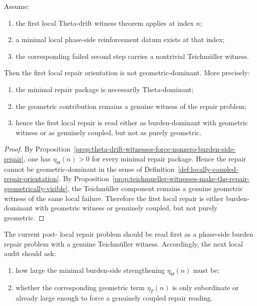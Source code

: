 \begin{theorem}
\label{thm:first-local-repair-orientation-theorem}
Assume:
\begin{enumerate}
 \item the first local Theta-drift witness theorem applies at index \(n\);
 \item a minimal local phase-side reinforcement datum exists at that index;
 \item the corresponding failed second step carries a nontrivial Teichm\"uller witness.
\end{enumerate}
Then the first local repair orientation is not geometric-dominant.
More precisely:
\begin{enumerate}
 \item the minimal repair package is necessarily Theta-dominant;
 \item the geometric contribution remains a genuine witness of the repair problem;
 \item hence the first local repair is read either as burden-dominant with geometric witness or as genuinely coupled, but not as purely geometric.
\end{enumerate}
\end{theorem}

\begin{proof}
By Proposition~\ref{prop:theta-drift-witnesses-force-nonzero-burden-side-repair}, one has \(\eta_{\Theta}(n)>0\) for every minimal repair package.
Hence the repair cannot be geometric-dominant in the sense of Definition~\ref{def:locally-coupled-repair-orientation}.
By Proposition~\ref{prop:teichmueller-witnesses-make-the-repair-geometrically-visible}, the Teichm\"uller component remains a genuine geometric witness of the same local failure.
Therefore the first local repair is either burden-dominant with geometric witness or genuinely coupled, but not purely geometric.
\end{proof}

\begin{corollary}
\label{cor:current-post-r21-repair-reading}
The current post- local repair problem should be read first as a phase-side burden repair problem with a genuine Teichm\"uller witness.
Accordingly, the next local audit should ask:
\begin{enumerate}
 \item how large the minimal burden-side strengthening \(\eta_{\Theta}(n)\) must be;
 \item whether the corresponding geometric term \(\eta_{T}(n)\) is only subordinate or already large enough to force a genuinely coupled repair reading.
\end{enumerate}
\end{corollary}

